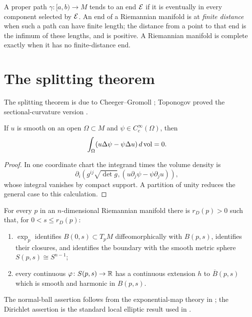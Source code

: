 A proper path $\gamma\colon[a,b)\to M$ tends to an end $\mathcal{E}$ if it is
eventually in every component selected by $\mathcal{E}$. An end of a Riemannian
manifold is at \emph{finite distance} when such a path can have finite
length; the distance from a point to that end is the infimum of these
lengths, and is positive. A Riemannian manifold is complete exactly when it has no
finite-distance end.


\section{The splitting theorem}

The splitting theorem is due to Cheeger--Gromoll
\cite{CheegerGromoll2}; Toponogov proved the sectional-curvature version
\cite{Toponogov}.

\begin{lemma}
\label{lem:green-identity-compact-support}



If $u$ is smooth on an open $\Omega\subset M$ and
$\psi\in C_c^\infty(\Omega)$, then
$$\int_\Omega(u\Delta\psi-\psi\Delta u)\,d\operatorname{vol}=0.$$
\end{lemma}
\begin{proof}
\sketch
{}
In one coordinate chart the integrand times the volume density is
$$\partial_i\!\left(g^{ij}\sqrt{\det g},
(u\partial_j\psi-\psi\partial_ju)\right),$$
whose integral vanishes by compact support. A partition of unity reduces
the general case to this calculation.
\end{proof}

\begin{claim}
\label{claim:dirichlet-problem-small-balls}

For every $p$ in an $n$-dimensional Riemannian manifold there is
$r_D(p)>0$ such that, for $0<s\le r_D(p)$:
\begin{enumerate}
\item $\exp_p$ identifies $B(0,s)\subset T_pM$ diffeomorphically with
$B(p,s)$, identifies their closures, and identifies the boundary with
the smooth metric sphere $S(p,s)\cong S^{n-1}$;
\item every continuous $\varphi\colon S(p,s)\to\mathbb{R}$ has a continuous
extension $h$ to $\overline B(p,s)$ which is smooth and harmonic in
$B(p,s)$.
\end{enumerate}
The normal-ball assertion follows from the exponential-map theory in
\cite{doCarmo}; the Dirichlet assertion is the standard local elliptic
result used in \cite{Petersen}.
\end{claim}

